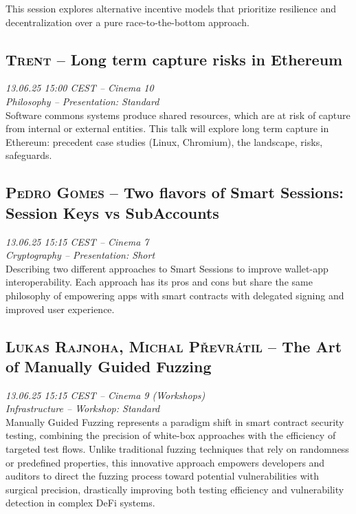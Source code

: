 This session explores alternative incentive models that prioritize resilience and decentralization over a pure race-to-the-bottom approach.

\clearpage
\subsection {\textsc{Trent}  -- Long term capture risks in Ethereum} \noindent \textit {13.06.25 15:00 CEST -- Cinema 10\\ Philosophy -- Presentation: Standard}\\[1em] Software commons systems produce shared resources, which are at risk of capture from internal or external entities. This talk will explore long term capture in Ethereum: precedent case studies (Linux, Chromium), the landscape, risks, safeguards.

\clearpage
\subsection {\textsc{Pedro Gomes}  -- Two flavors of Smart Sessions: Session Keys vs SubAccounts} \noindent \textit {13.06.25 15:15 CEST -- Cinema 7\\ Cryptography -- Presentation: Short}\\[1em] Describing two different approaches to Smart Sessions to improve wallet-app interoperability. Each approach has its pros and cons but share the same philosophy of empowering apps with smart contracts with delegated signing and improved user experience.

\clearpage
\subsection {\textsc{Lukas Rajnoha, Michal Převrátil}  -- The Art of Manually Guided Fuzzing} \noindent \textit {13.06.25 15:15 CEST -- Cinema 9 (Workshops)\\ Infrastructure -- Workshop: Standard}\\[1em] Manually Guided Fuzzing represents a paradigm shift in smart contract security testing, combining the precision of white-box approaches with the efficiency of targeted test flows. Unlike traditional fuzzing techniques that rely on randomness or predefined properties, this innovative approach empowers developers and auditors to direct the fuzzing process toward potential vulnerabilities with surgical precision, drastically improving both testing efficiency and vulnerability detection in complex DeFi systems.

